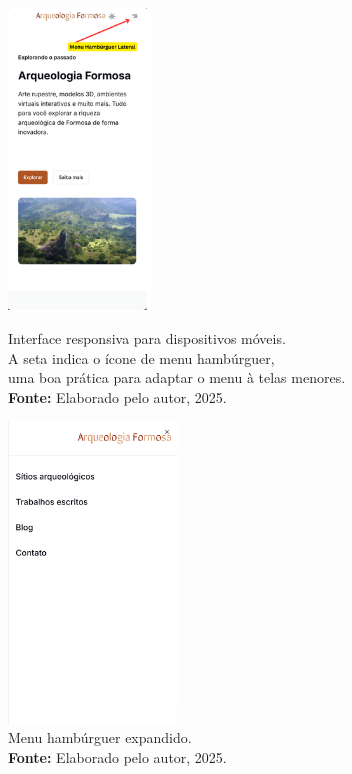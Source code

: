 \begin{enumerate}
    \begin{figure}[H]
    \centering
    \begin{minipage}{0.45\textwidth} %
        \centering
    \includegraphics[height=8cm, keepaspectratio]{img/site/menu hamburguer lateral.png}
    \caption{ Interface responsiva para dispositivos móveis.\\ A seta indica o ícone de menu hambúrguer, \\uma boa prática para adaptar o menu à telas menores.\\
        \textbf{Fonte:} Elaborado pelo autor, 2025.}
    \label{fig:menu hamburguer}   
    \end{minipage}
    \hspace{1cm} %
    \begin{minipage}{0.45\textwidth} %
        \centering
        \includegraphics[height=8cm, keepaspectratio]{img/site/menu mobile.png}
        \caption{Menu hambúrguer expandido.\\
            \textbf{Fonte:} Elaborado pelo autor, 2025.}
        \label{fig:menu mobile}
    \end{minipage}
\end{figure}


\end{enumerate}
